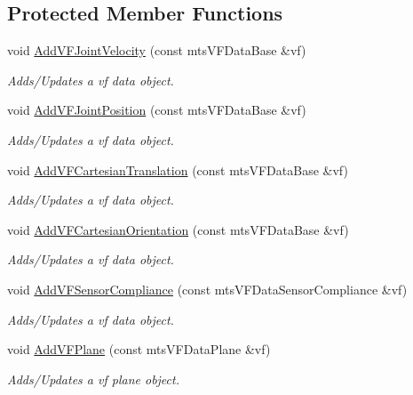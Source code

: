 \subsection*{Protected Member Functions}
\begin{DoxyCompactItemize}
\item 
void \hyperlink{classmts_v_f_controller_ae70b46834ff034559ce9b3686e5491d5}{Add\-V\-F\-Joint\-Velocity} (const mts\-V\-F\-Data\-Base \&vf)
\begin{DoxyCompactList}\small\item\em Adds/\-Updates a vf data object. \end{DoxyCompactList}\item 
void \hyperlink{classmts_v_f_controller_a4602b21dbc406f5da5d57ccad53f3528}{Add\-V\-F\-Joint\-Position} (const mts\-V\-F\-Data\-Base \&vf)
\begin{DoxyCompactList}\small\item\em Adds/\-Updates a vf data object. \end{DoxyCompactList}\item 
void \hyperlink{classmts_v_f_controller_a4f8136fca2b4840412a52ef9a679500b}{Add\-V\-F\-Cartesian\-Translation} (const mts\-V\-F\-Data\-Base \&vf)
\begin{DoxyCompactList}\small\item\em Adds/\-Updates a vf data object. \end{DoxyCompactList}\item 
void \hyperlink{classmts_v_f_controller_ac02fa25858e0e7305f07663a69636fe9}{Add\-V\-F\-Cartesian\-Orientation} (const mts\-V\-F\-Data\-Base \&vf)
\begin{DoxyCompactList}\small\item\em Adds/\-Updates a vf data object. \end{DoxyCompactList}\item 
void \hyperlink{classmts_v_f_controller_a7d4ca819b6e68d9b33b5ef02172fffff}{Add\-V\-F\-Sensor\-Compliance} (const mts\-V\-F\-Data\-Sensor\-Compliance \&vf)
\begin{DoxyCompactList}\small\item\em Adds/\-Updates a vf data object. \end{DoxyCompactList}\item 
void \hyperlink{classmts_v_f_controller_afa5a3424cc0d16e49728edd375aaedc4}{Add\-V\-F\-Plane} (const mts\-V\-F\-Data\-Plane \&vf)
\begin{DoxyCompactList}\small\item\em Adds/\-Updates a vf plane object. \end{DoxyCompactList}\item 

\end{DoxyCompactItemize}
